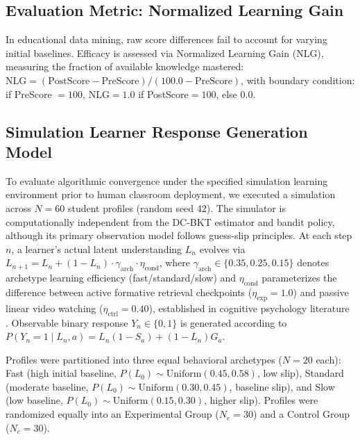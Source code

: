 \documentclass[notitlepage,12pt]{jedm}
\begin{document}
\subsection{Evaluation Metric: Normalized Learning Gain}
In educational data mining, raw score differences fail to account for varying initial baselines. Efficacy is assessed via Normalized Learning Gain (NLG), measuring the fraction of available knowledge mastered: $\text{NLG} = (\text{PostScore} - \text{PreScore}) / (100.0 - \text{PreScore})$, with boundary condition: if PreScore $=100$, NLG$=1.0$ if PostScore$=100$, else $0.0$.

\subsection{Simulation Learner Response Generation Model}
To evaluate algorithmic convergence under the specified simulation learning environment prior to human classroom deployment, we executed a simulation across $N=60$ student profiles (random seed 42). The simulator is computationally independent from the DC-BKT estimator and bandit policy, although its primary observation model follows guess-slip principles. At each step $n$, a learner's actual latent understanding $L_n$ evolves via $L_{n+1} = L_n + (1-L_n) \cdot \gamma_{\text{arch}} \cdot \eta_{\text{cond}}$, where $\gamma_{\text{arch}} \in \{0.35, 0.25, 0.15\}$ denotes archetype learning efficiency (fast/standard/slow) and $\eta_{\text{cond}}$ parameterizes the difference between active formative retrieval checkpoints ($\eta_{\text{exp}}=1.0$) and passive linear video watching ($\eta_{\text{ctrl}}=0.40$), established in cognitive psychology literature \cite{karpicke2008critical,dunlosky2013improving}. Observable binary response $Y_n \in \{0,1\}$ is generated according to $P(Y_n=1 \mid L_n, a) = L_n(1-S_a) + (1-L_n)G_a$.

Profiles were partitioned into three equal behavioral archetypes ($N=20$ each): Fast (high initial baseline, $P(L_0)\sim\text{Uniform}(0.45,0.58)$, low slip), Standard (moderate baseline, $P(L_0)\sim\text{Uniform}(0.30,0.45)$, baseline slip), and Slow (low baseline, $P(L_0)\sim\text{Uniform}(0.15,0.30)$, higher slip). Profiles were randomized equally into an Experimental Group ($N_e=30$) and a Control Group ($N_c=30$).
\end{document}

